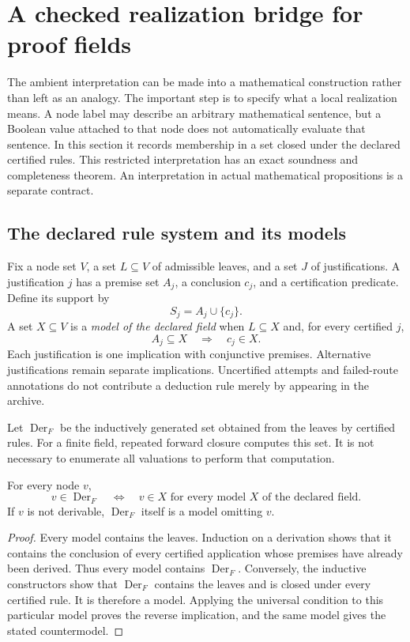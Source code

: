 \section{A checked realization bridge for proof fields}
\label{sec:checked-bridge}

The ambient interpretation can be made into a mathematical construction rather than left as an analogy. The important step is to specify what a local realization means. A node label may describe an arbitrary mathematical sentence, but a Boolean value attached to that node does not automatically evaluate that sentence. In this section it records membership in a set closed under the declared certified rules. This restricted interpretation has an exact soundness and completeness theorem. An interpretation in actual mathematical propositions is a separate contract.

\subsection{The declared rule system and its models}

Fix a node set $V$, a set $L\subseteq V$ of admissible leaves, and a set $J$ of justifications. A justification $j$ has a premise set $A_j$, a conclusion $c_j$, and a certification predicate. Define its support by
\[
S_j=A_j\cup\{c_j\}.
\]
A set $X\subseteq V$ is a \emph{model of the declared field} when $L\subseteq X$ and, for every certified $j$,
\[
A_j\subseteq X\quad\Longrightarrow\quad c_j\in X.
\]
Each justification is one implication with conjunctive premises. Alternative justifications remain separate implications. Uncertified attempts and failed-route annotations do not contribute a deduction rule merely by appearing in the archive.

Let $\operatorname{Der}_F$ be the inductively generated set obtained from the leaves by certified rules. For a finite field, repeated forward closure computes this set. It is not necessary to enumerate all valuations to perform that computation.

\begin{theorem}
\label{thm:relative-completeness}
For every node $v$,
\[
v\in\operatorname{Der}_F
\quad\Longleftrightarrow\quad
\text{$v\in X$ for every model $X$ of the declared field}.
\]
If $v$ is not derivable, $\operatorname{Der}_F$ itself is a model omitting $v$.
\end{theorem}
\begin{proof}
Every model contains the leaves. Induction on a derivation shows that it contains the conclusion of every certified application whose premises have already been derived. Thus every model contains $\operatorname{Der}_F$. Conversely, the inductive constructors show that $\operatorname{Der}_F$ contains the leaves and is closed under every certified rule. It is therefore a model. Applying the universal condition to this particular model proves the reverse implication, and the same model gives the stated countermodel.
\end{proof}


